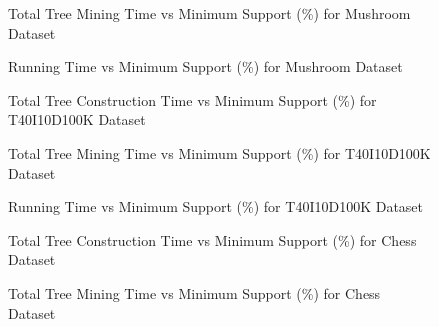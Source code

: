             \begin{figure}[h]
            \centering
                
            \caption{Total Tree Mining Time vs Minimum Support (\%) for Mushroom Dataset }
            \label{result:g_m_mining_total}
            \end{figure}
            \begin{figure}[h]
            \centering
                
            \caption{Running Time vs Minimum Support (\%) for Mushroom Dataset }
            \label{result:g_m_total}
            \end{figure}
            \begin{figure}[h]
            \centering
                
            \caption{Total Tree Construction Time vs Minimum Support (\%) for T40I10D100K Dataset }
            \label{result:g_t10_tree_construction_total}
            \end{figure}
            
            \begin{figure}[h]
            \centering
                
            \caption{Total Tree Mining Time vs Minimum Support (\%) for T40I10D100K Dataset }
            \label{result:g_t10_mining_total}
            \end{figure}
            
            \begin{figure}[h]
            \centering
                
            \caption{Running Time vs Minimum Support (\%) for T40I10D100K Dataset }
            \label{result:g_t10_total}
            \end{figure}
    
            \begin{figure}[h]
            \centering
                
            \caption{Total Tree Construction Time vs Minimum Support (\%) for Chess Dataset }
            \label{result:g_chess_tree_construction_total}
            \end{figure}
            
            \begin{figure}[h]
            \centering
                
            \caption{Total Tree Mining Time vs Minimum Support (\%) for Chess Dataset }
            \label{result:g_chess_mining_total}
            \end{figure}
            
